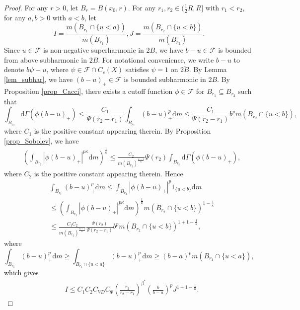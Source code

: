 \documentclass[11pt,a4paper]{article}
\numberwithin{equation}{section}
\theoremstyle{plain}
\theoremstyle{definition}
\begin{document}
\begin{proof}
For any $r>0$, let $B_r=B(x_0,r)$. For any $r_1,r_2\in(\frac{1}{2}R,R]$ with $r_1<r_2$, for any $a,b>0$ with $a<b$, let
$$I=\frac{m(B_{r_1}\cap\{u<a\})}{m(B_{r_1})}, J=\frac{m(B_{r_2}\cap\{u<b\})}{m(B_{r_2})}.$$
Since $u\in\mathcal{F}$ is non-negative superharmonic in $2B$, we have $b-u\in\mathcal{F}$ is bounded from above subharmonic in $2B$. For notational convenience, we write $b-u$ to denote $b\psi-u$, where $\psi\in\mathcal{F}\cap C_c(X)$ satisfies $\psi=1$ on $\overline{2B}$. By Lemma \ref{lem_subhar}, we have $(b-u)_+\in\mathcal{F}$ is bounded subharmonic in $2B$. By Proposition \ref{prop_Cacci}, there exists a cutoff function $\phi\in\mathcal{F}$ for $B_{r_1}\subseteq B_{r_2}$ such that
$$\int_{B_{r_2}}\mathrm{d}\Gamma(\phi(b-u)_+)\le \frac{C_1}{\Psi(r_2-r_1)}\int_{B_{r_2}}(b-u)_+^p\mathrm{d} m\le\frac{C_1}{\Psi(r_2-r_1)}b^pm(B_{r_2}\cap\{u<b\}),$$
where $C_1$ is the positive constant appearing therein. By Proposition \ref{prop_Sobolev}, we have
\begin{align*}
&\left(\int_{B_{r_2}}|\phi(b-u)_+|^{p\kappa}\mathrm{d} m\right)^{\frac{1}{\kappa}}\le \frac{C_2}{m(B_{r_2})^{\frac{\kappa-1}{\kappa}}}\Psi(r_2)\int_{B_{r_2}}\mathrm{d}\Gamma(\phi(b-u)_+),
\end{align*}
where $C_2$ is the positive constant appearing therein. Hence
\begin{align*}
&\int_{B_{r_1}}(b-u)_+^p\mathrm{d} m\le\int_{B_{r_2}}|\phi(b-u)_+|^p1_{\{u<b\}}\mathrm{d} m\\
&\le\left(\int_{B_{r_2}}|\phi(b-u)_+|^{p\kappa}\mathrm{d} m\right)^{\frac{1}{\kappa}}m(B_{r_2}\cap\{u<b\})^{1-\frac{1}{\kappa}}\\
&\le\frac{C_1C_2}{m(B_{r_2})^{\frac{\kappa-1}{\kappa}}}\frac{\Psi(r_2)}{\Psi(r_2-r_1)}b^pm(B_{r_2}\cap\{u<b\})^{1+1-\frac{1}{\kappa}},
\end{align*}
where
$$\int_{B_{r_1}}(b-u)_+^p\mathrm{d} m\ge \int_{B_{r_1}\cap\{u<a\}}(b-u)_+^p\mathrm{d} m\ge (b-a)^p m(B_{r_1}\cap\{u<a\}),$$
which gives
\begin{align*}
&I\le C_1C_2C_{VD}C_\Psi \left(\frac{r_2}{r_2-r_1}\right)^{\beta^*}\left(\frac{b}{b-a}\right)^pJ^{1+1-\frac{1}{\kappa}}.
\end{align*}


\end{proof}
\end{document}
